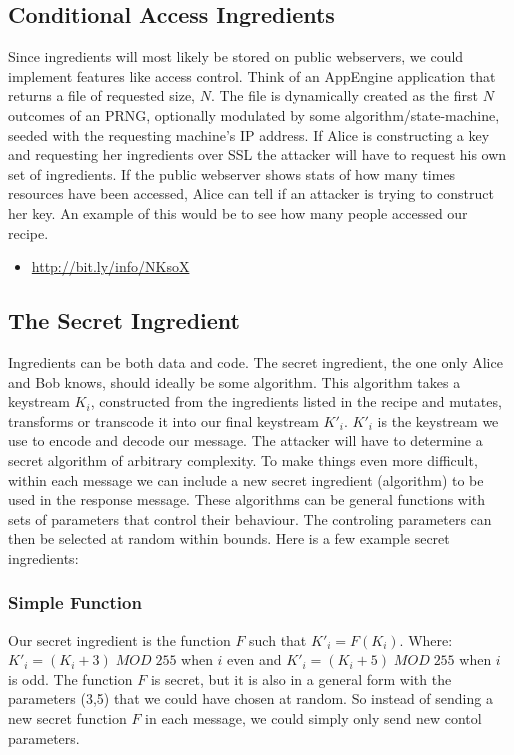 \documentclass[10pt,conference,a4article]{IEEEtran}
\begin{document}
\subsection{Conditional Access Ingredients}
Since ingredients will most likely be stored on public webservers, we could implement
features like access control. Think of an AppEngine application that returns a file of
requested size, $N$. The file is dynamically created as the first $N$ outcomes of an PRNG,
optionally modulated by some algorithm/state-machine, seeded with the requesting 
machine's IP address. If Alice is constructing a key and requesting her ingredients 
over SSL the attacker will have to request his own set of ingredients. If the public 
webserver shows stats of how many times resources have been accessed, Alice can tell 
if an attacker is trying to construct her key. An example of this would be to see how
many people accessed our recipe.
\begin{itemize}
\item{\url{http://bit.ly/info/NKsoX}}
\end{itemize}

\subsection{The Secret Ingredient}
Ingredients can be both data and code. The secret ingredient, the one only Alice and
Bob knows, should ideally be some algorithm. This algorithm takes a keystream $K_i$,
constructed from the ingredients listed in the recipe and mutates, transforms or 
transcode it into our final keystream $K'_i$. $K'_i$ is the keystream we use to encode
and decode our message. The attacker will have to determine a secret algorithm of
arbitrary complexity. To make things even more difficult, within each message we can
include a new secret ingredient (algorithm) to be used in the response message.
These algorithms can be general functions with sets of parameters that control their
behaviour. The controling parameters can then be selected at random within bounds. 
Here is a few example secret ingredients:
\\
\subsubsection{Simple Function}
Our secret ingredient is the function $F$ such that $K'_i = F(K_i)$. Where:
$K'_i = (K_i + 3)\;MOD\;255$ when $i$ even and $K'_i = (K_i + 5)\;MOD\;255$ when 
$i$ is odd. The function $F$ is secret, but it is also in a general form with the
parameters (3,5) that we could have chosen at random. So instead of sending a new
secret function $F$ in each message, we could simply only send new contol parameters.
\\
\end{document}
